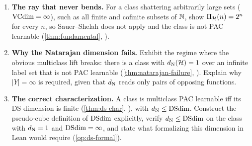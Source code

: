 \begin{enumerate}[leftmargin=*,itemsep=3pt]
\item \textbf{The ray that never bends.} For a class shattering arbitrarily large sets ($\mathrm{VCdim} = \infty$), such as all finite and cofinite subsets of $\mathbb{N}$, show $\Pi_\mathcal{H}(n) = 2^n$ for every $n$, so Sauer--Shelah does not apply and the class is not PAC learnable (\cref{thm:fundamental}, ).

\item \textbf{Why the Natarajan dimension fails.} Exhibit the regime where the obvious multiclass lift breaks: there is a class with $d_{\mathrm{N}}(\mathcal{H}) = 1$ over an infinite label set that is not PAC learnable (\cref{thm:natarajan-failure}, \cite{BrukhimCarmonDinurMoranYehudayoff2022}). Explain why $|Y| = \infty$ is required, given that $d_{\mathrm{N}}$ reads only pairs of opposing functions.

\item \textbf{The correct characterization.} A class is multiclass PAC learnable iff its DS dimension is finite (\cref{thm:ds-char}, \cite{BrukhimCarmonDinurMoranYehudayoff2022}), with $d_{\mathrm{N}} \le \mathrm{DSdim}$. Construct the pseudo-cube definition of $\mathrm{DSdim}$ explicitly, verify $d_{\mathrm{N}} \le \mathrm{DSdim}$ on the class with $d_{\mathrm{N}} = 1$ and $\mathrm{DSdim} = \infty$, and state what formalizing this dimension in Lean would require (\cref{op:ds-formal}).
\end{enumerate}
